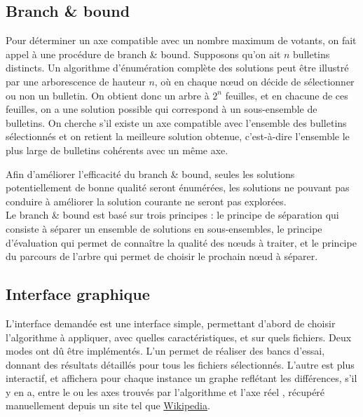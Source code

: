 \documentclass[11pt, a4paper]{article}
\begin{document}
\subsection{Branch \& bound}

Pour d\'{e}terminer un axe compatible avec un nombre maximum de votants, on fait appel \`{a} une proc\'{e}dure de branch \& bound. Supposons qu'on ait $n$ bulletins distincts. Un algorithme d'\'{e}num\'{e}ration compl\`{e}te des solutions peut \^{e}tre illustr\'{e} par une arborescence de hauteur $n$, o\`{u} en chaque n\oe{}ud on d\'{e}cide de s\'{e}lectionner ou non un bulletin. On obtient donc un arbre \`{a} $2^{n}$ feuilles, et en chacune de ces feuilles, on a une solution possible qui correspond \`{a} un sous-ensemble de bulletins. On cherche s'il existe un axe compatible avec l'ensemble des bulletins s\'{e}lectionn\'{e}s et on retient la meilleure solution obtenue, c'est-\`{a}-dire l'ensemble le plus large de bulletins coh\'{e}rents avec un m\^{e}me axe.

Afin d'am\'{e}liorer l'efficacit\'{e} du branch \& bound, seules les solutions potentiellement de bonne qualit\'{e} seront \'{e}num\'{e}r\'{e}es, les solutions ne pouvant pas conduire \`{a} am\'{e}liorer la solution courante ne seront pas explor\'{e}es.\\

Le branch \& bound est bas\'{e} sur trois principes : le principe de s\'{e}paration qui consiste \`{a} s\'{e}parer un ensemble de solutions en sous-ensembles, le principe d'\'{e}valuation qui permet de conna\^{i}tre la qualit\'{e} des n\oe{}uds \`{a} traiter, et le principe du parcours de l'arbre qui permet de choisir le prochain n\oe{}ud \`{a} s\'{e}parer.

\subsection{Interface graphique}

L'interface demand\'{e}e est une interface simple, permettant d'abord de choisir l'algorithme \`{a} appliquer, avec quelles caract\'{e}ristiques, et sur quels fichiers. Deux modes ont d\^{u} \^{e}tre impl\'{e}ment\'{e}s. L'un permet de r\'{e}aliser des bancs d'essai, donnant des r\'{e}sultats d\'{e}taill\'{e}s pour tous les fichiers s\'{e}lectionn\'{e}s. L'autre est plus interactif, et affichera pour chaque instance un graphe refl\'{e}tant les diff\'{e}rences, s'il y en a, entre le ou les axes trouv\'{e}s par l'algorithme et l'axe \og r\'{e}el \fg{}, r\'{e}cup\'{e}r\'{e} manuellement depuis un site tel que \href{www.wikipedia.fr}{Wikipedia}.
\end{document}
